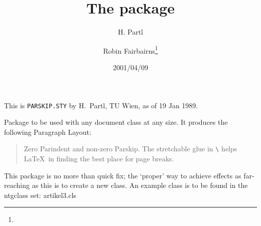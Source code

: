 \documentclass[pagesize=auto, fontsize=14pt, DIV=10, parskip=half]{scrartcl}
\title{The \pkg{parskip} package}
\author{H. Partl\and Robin Fairbairns\thanks{\mail{rf10@cam.ac.uk}}}
\date{2001/04/09}
\makeatletter
\newcommand*{\cls}[1]{\textsf{#1}}
\newcommand*{\cs}[1]{\texttt{\textbackslash#1}}
\newcommand*{\cmd}[1]{\cs{\expandafter\@gobble\string#1}}
\makeatother
\begin{document}
\maketitle

This is \texttt{PARSKIP.STY} by H.~Partl, TU Wien, as of 19 Jan 1989.

Package to be used with any document class at any size.
It produces the following Paragraph Layout:

\begin{quote}
  Zero Parindent and non-zero Parskip. The stretchable glue in \cmd{\parskip}
  helps \LaTeX\ in finding the best place for page breaks.
\end{quote}

This package is no more than quick fix; the `proper' way to achieve
effects as far-reaching as this is to create a new class.  An
example class is to be found in the \cls{ntgclass} set: \cls{artikel3.cls}
\end{document}
